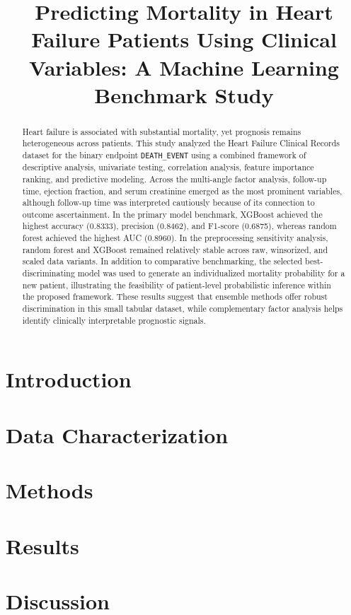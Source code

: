 \documentclass[11pt]{article}
\title{Predicting Mortality in Heart Failure Patients Using Clinical Variables: A Machine Learning Benchmark Study}
\author{}
\date{}
\begin{document}
\maketitle

\begin{abstract}
Heart failure is associated with substantial mortality, yet prognosis remains heterogeneous across patients. This study analyzed the Heart Failure Clinical Records dataset for the binary endpoint \texttt{DEATH\_EVENT} using a combined framework of descriptive analysis, univariate testing, correlation analysis, feature importance ranking, and predictive modeling. Across the multi-angle factor analysis, follow-up time, ejection fraction, and serum creatinine emerged as the most prominent variables, although follow-up time was interpreted cautiously because of its connection to outcome ascertainment. In the primary model benchmark, XGBoost achieved the highest accuracy (0.8333), precision (0.8462), and F1-score (0.6875), whereas random forest achieved the highest AUC (0.8960). In the preprocessing sensitivity analysis, random forest and XGBoost remained relatively stable across raw, winsorized, and scaled data variants. In addition to comparative benchmarking, the selected best-discriminating model was used to generate an individualized mortality probability for a new patient, illustrating the feasibility of patient-level probabilistic inference within the proposed framework. These results suggest that ensemble methods offer robust discrimination in this small tabular dataset, while complementary factor analysis helps identify clinically interpretable prognostic signals.
\end{abstract}

\section{Introduction}


\section{Data Characterization}


\section{Methods}


\section{Results}


\section{Discussion}




\end{document}
